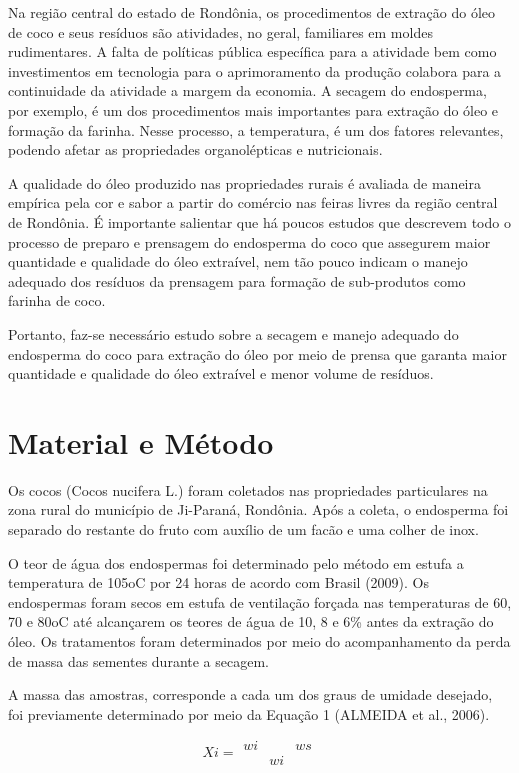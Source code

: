 \documentclass[article,12pt,onesidea,4paper,english,brazil]{abntex2}
\begin{document}
	Na região central do estado de Rondônia, os procedimentos de extração do óleo de coco e seus resíduos são atividades, no geral, familiares em moldes rudimentares. A falta de políticas pública específica para a atividade bem como investimentos em tecnologia para o aprimoramento da produção colabora para a continuidade da atividade a margem da economia. A secagem do endosperma, por exemplo, é um dos procedimentos mais importantes para extração do óleo e formação da farinha. Nesse processo, a temperatura, é um dos fatores relevantes, podendo afetar as propriedades organolépticas e nutricionais.
	
	A qualidade do óleo produzido nas propriedades rurais é avaliada de maneira empírica pela cor e sabor a partir do comércio nas feiras livres da região central de Rondônia. É importante salientar que há poucos estudos que descrevem todo o processo de preparo e prensagem do endosperma do coco que assegurem maior quantidade e qualidade do óleo extraível, nem tão pouco indicam o manejo adequado dos resíduos da prensagem para formação de sub-produtos como farinha de coco.
	
	Portanto, faz-se necessário estudo sobre a secagem e manejo adequado do endosperma do coco para extração do óleo por meio de prensa que garanta maior quantidade e qualidade do óleo extraível e menor volume de resíduos.
	
	\section*{Material e Método}
	
	Os cocos (Cocos nucifera L.) foram coletados nas propriedades particulares na zona rural do município de Ji-Paraná, Rondônia. Após a coleta, o endosperma foi separado do restante do fruto com auxílio de um facão e uma colher de inox.
	
	O teor de água dos endospermas foi determinado pelo método em estufa a temperatura de 105oC por 24 horas de acordo com Brasil (2009). Os endospermas foram secos em estufa de ventilação forçada nas temperaturas de 60, 70 e 80oC até alcançarem os teores de água de 10, 8 e 6\% antes da extração do óleo. Os tratamentos foram determinados por meio do acompanhamento da perda de massa das sementes durante a secagem.
	
	A massa das amostras, corresponde a cada um dos graus de umidade desejado, foi previamente determinado por meio da Equação 1 (ALMEIDA et al., 2006).
	
	\begin{equation}
	Xi = \begin{matrix}
	wi & & ws \\ 
	& wi &
	\end{matrix}
	\end{equation}
	
\end{document}
